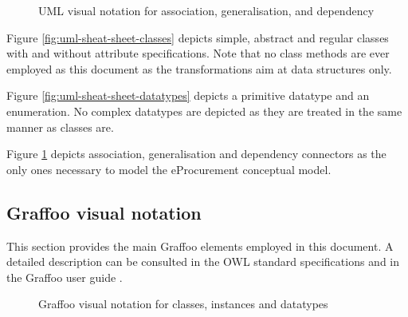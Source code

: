 	\begin{figure}[!ht]
		\centering
		\caption{UML visual notation for association, generalisation, and dependency}
		\label{fig:uml-sheat-sheet-associations}
	\end{figure}
	
	Figure \ref{fig:uml-sheat-sheet-classes} depicts simple, abstract and regular classes with and without attribute specifications. Note that no class methods are ever employed as this document as the transformations aim at data structures only. 
	
	Figure \ref{fig:uml-sheat-sheet-datatypes} depicts a primitive datatype and an enumeration. No complex datatypes are depicted as they are treated in the same manner as classes are. 
	
	Figure \ref{fig:uml-sheat-sheet-associations} depicts association, generalisation and dependency connectors as the only ones necessary to model the eProcurement conceptual model. 
	
	\subsection{Graffoo visual notation}
	
	This section provides the main Graffoo elements employed in this document. A detailed description can be consulted in the OWL standard specifications \citep{owl2} and in the Graffoo user guide \cite{graffoo-falco2014modelling}.
	
	\begin{figure}[!h]
		\centering
		\caption{Graffoo visual notation for classes, instances and datatypes}
		\label{fig:graffoo-classes}
	\end{figure}
	
